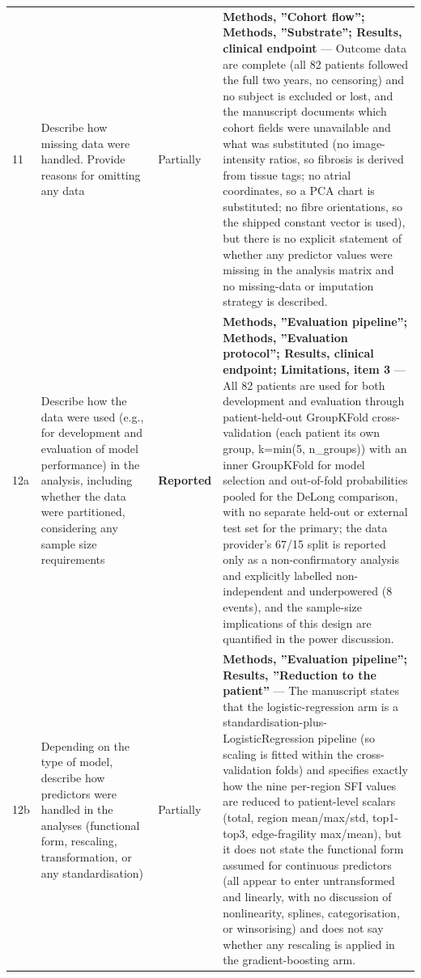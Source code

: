 \documentclass[10pt]{article}
\begin{document}
\begin{longtable}{@{}p{0.9cm} p{6.2cm} p{1.9cm} p{12.4cm}@{}}
11 & Describe how missing data were handled. Provide reasons for omitting any data & Partially & \textbf{Methods, ''Cohort flow''; Methods, ''Substrate''; Results, clinical endpoint} --- Outcome data are complete (all 82 patients followed the full two years, no censoring) and no subject is excluded or lost, and the manuscript documents which cohort fields were unavailable and what was substituted (no image-intensity ratios, so fibrosis is derived from tissue tags; no atrial coordinates, so a PCA chart is substituted; no fibre orientations, so the shipped constant vector is used), but there is no explicit statement of whether any predictor values were missing in the analysis matrix and no missing-data or imputation strategy is described. \\[2pt]
12a & Describe how the data were used (e.g., for development and evaluation of model performance) in the analysis, including whether the data were partitioned, considering any sample size requirements & \textbf{Reported} & \textbf{Methods, ''Evaluation pipeline''; Methods, ''Evaluation protocol''; Results, clinical endpoint; Limitations, item 3} --- All 82 patients are used for both development and evaluation through patient-held-out GroupKFold cross-validation (each patient its own group, k=min(5, n\_groups)) with an inner GroupKFold for model selection and out-of-fold probabilities pooled for the DeLong comparison, with no separate held-out or external test set for the primary; the data provider's 67/15 split is reported only as a non-confirmatory analysis and explicitly labelled non-independent and underpowered (8 events), and the sample-size implications of this design are quantified in the power discussion. \\[2pt]
12b & Depending on the type of model, describe how predictors were handled in the analyses (functional form, rescaling, transformation, or any standardisation) & Partially & \textbf{Methods, ''Evaluation pipeline''; Results, ''Reduction to the patient''} --- The manuscript states that the logistic-regression arm is a standardisation-plus-LogisticRegression pipeline (so scaling is fitted within the cross-validation folds) and specifies exactly how the nine per-region SFI values are reduced to patient-level scalars (total, region mean/max/std, top1-top3, edge-fragility max/mean), but it does not state the functional form assumed for continuous predictors (all appear to enter untransformed and linearly, with no discussion of nonlinearity, splines, categorisation, or winsorising) and does not say whether any rescaling is applied in the gradient-boosting arm. \\[2pt]

\end{longtable}
\end{document}
